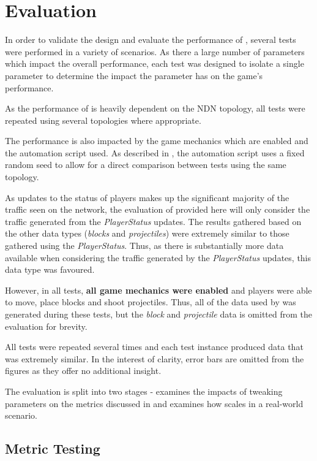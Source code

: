 \chapter{Evaluation}\label{sec:eval}
In order to validate the design and evaluate the performance of \game{}, several tests were performed in a variety of scenarios. As there a large number of parameters which impact the overall performance, each test was designed to isolate a single parameter to determine the impact the parameter has on the game's performance.

As the performance of \game{} is heavily dependent on the NDN topology, all tests were repeated using several topologies where appropriate.

The performance is also impacted by the game mechanics which are enabled and the automation script used. As described in , the automation script uses a fixed random seed to allow for a direct comparison between tests using the same topology.

As updates to the status of players makes up the significant majority of the traffic seen on the network, the evaluation of \game{} provided here will only consider the traffic generated from the \textit{PlayerStatus} updates. The results gathered based on the other data types (\textit{blocks} and \textit{projectiles}) were extremely similar to those gathered using the \textit{PlayerStatus}. Thus, as there is substantially more data available when considering the traffic generated by the \textit{PlayerStatus} updates, this data type was favoured. 

However, in all tests, \textbf{all game mechanics were enabled} and players were able to move, place blocks and shoot projectiles. Thus, all of the data used by \game{} was generated during these tests, but the \textit{block} and \textit{projectile} data is omitted from the evaluation for brevity.  

All tests were repeated several times and each test instance produced data that was extremely similar. In the interest of clarity, error bars are omitted from the figures as they offer no additional insight.

The evaluation is split into two stages -  examines the impacts of tweaking parameters on the metrics discussed in  and  examines how \game{} scales in a real-world scenario.


\section{Metric Testing}\label{sec:eval:metrics-testing}


